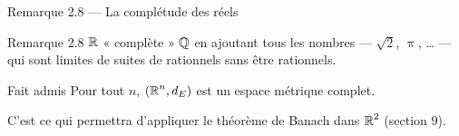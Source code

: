 \begin{frame}{Remarque 2.8 --- La complétude des réels}
  \begin{Rem}{Remarque 2.8}
    $\operatorname{\mathbb{R}}$ « complète » $\operatorname{\mathbb{Q}}$ en ajoutant tous les nombres --- $\sqrt2$,
    $\uppi$, … --- qui sont limites de suites de rationnels sans être
    rationnels.
  \end{Rem}
  \vspace{6pt}
  \begin{Enonce}{Fait admis}
    Pour tout $n$, $(\operatorname{\mathbb{R}}^n,d_E)$ est un espace métrique complet.
  \end{Enonce}
  \vspace{4pt}
  \small C'est ce qui permettra d'appliquer le théorème de Banach dans
  $\operatorname{\mathbb{R}}^2$ (section 9).
\end{frame}
